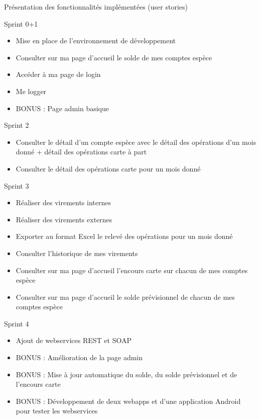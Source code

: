 \begin{frame}
	\begin{center}
		\huge{Pr\'esentation des fonctionnalit\'es impl\'ement\'ees (user stories) }
	\end{center}
\end{frame}

\begin{frame}{Sprint 0+1}
\begin{itemize}
	\item Mise en place de l'environnement de d\'eveloppement
	\item Consulter sur ma page d'accueil le solde de mes comptes esp\`ece
	\item Acc\'eder \`a ma page de login
	\item Me logger
	\item BONUS : Page admin basique
\end{itemize}
\end{frame}

\begin{frame}{Sprint 2}
\begin{itemize}
	\item Consulter le d\'etail d'un compte esp\`ece avec le d\'etail des op\'erations d'un mois donn\'e + d\'etail des op\'erations carte \`a part
	\item Consulter le d\'etail des op\'erations carte pour un mois donn\'e
\end{itemize}
\end{frame}

\begin{frame}{Sprint 3}
\begin{itemize}
	\item R\'ealiser des virements internes
	\item R\'ealiser des virements externes
	\item Exporter au format Excel le relev\'e des op\'erations pour un mois donn\'e
	\item Consulter l'historique de mes virements
	\item Consulter sur ma page d'accueil l'encours carte sur chacun de mes comptes esp\`ece
	\item Consulter sur ma page d'accueil le solde pr\'evisionnel de chacun de mes comptes esp\`ece
\end{itemize}
\end{frame}

\begin{frame}{Sprint 4}
\begin{itemize}
	\item Ajout de webservices REST et SOAP
	\item BONUS : Am\'elioration de la page admin
	\item BONUS : Mise \`a jour automatique du solde, du solde pr\'evisionnel et de l'encours carte 
	\item BONUS : D\'eveloppement de deux webapps et d'une application Android pour tester les webservices
\end{itemize}
\end{frame}

